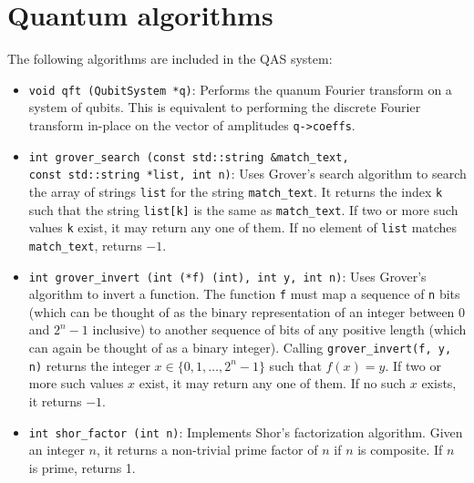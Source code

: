 \documentclass{article}
\begin{document}
\section{Quantum algorithms} 

The following algorithms are included in the QAS system: 
\begin{itemize} 
\item \verb~void qft (QubitSystem *q)~: Performs the quanum Fourier transform on a system of qubits. This is equivalent to performing the discrete Fourier transform in-place on the vector of amplitudes \verb~q->coeffs~. 

\item \verb~int grover_search (const std::string &match_text,~ \\
\verb~const std::string *list, int n)~: Uses Grover's search algorithm to search the array of strings \verb~list~ for the string \verb~match_text~. It returns the index \verb~k~ such that the string \verb~list[k]~ is the same as \verb~match_text~. If two or more such values \verb~k~ exist, it may return any one of them. If no element of \verb~list~ matches \verb~match_text~, returns $-1$. 

\item \verb~int grover_invert (int (*f) (int), int y, int n)~: Uses Grover's algorithm to invert a function. The function \verb~f~ must map a sequence of \verb~n~ bits (which can be thought of as the binary representation of an integer between 0 and $2^n - 1$ inclusive) to another sequence of bits of any positive length (which can again be thought of as a binary integer). Calling \verb~grover_invert(f, y, n)~ returns the integer $x \in \{0, 1, \dots, 2^n-1\}$ such that $f(x) = y$. If two or more such values $x$ exist, it may return any one of them. If no such $x$ exists, it returns $-1$. 

\item \verb~int shor_factor (int n)~: Implements Shor's factorization algorithm. Given an integer $n$, it returns a non-trivial prime factor of $n$ if $n$ is composite. If $n$ is prime, returns 1. 

\end{itemize} 
\end{document}
